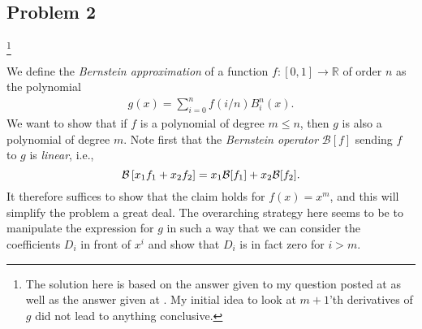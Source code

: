 \documentclass{amsart}
\begin{document}
\subsection*{Problem 2}\footnote{The solution here is based on the answer
	given to my question posted at \cite{1915642} as well as the
	answer given at \cite{377929}. My initial idea to look at $m+1$'th
	derivatives of $g$ did not lead to anything conclusive.}
	\label{sub:problem_2}

We define the \emph{Bernstein approximation} of a function $f: [0, 1] \to
\mathbb{R}$ of order $n$ as the polynomial
\begin{align*}
	g(x) = \sum^{n}_{i=0} f \left( i / n \right) B_i^n(x).
\end{align*}
We want to show that if $f$ is a polynomial of degree $m \leq n$, then $g$
is also a polynomial of degree $m$. Note first that the \emph{Bernstein
operator} $\mathcal{B}[f]$ sending $f$ to $g$ is \emph{linear}, i.e.,
\begin{equation}
	\notag
	\mathcal{B}\left[x_1f_1 + x_2f_2\right] = x_1\mathcal{B}[f_1] + x_2\mathcal{B}[f_2].
\end{equation}
It therefore suffices to show that the claim holds for $f(x) = x^m$, and
this will simplify the problem a great deal. The overarching strategy here
seems to be to manipulate the expression for $g$ in such a way that we can
consider the coefficients $D_i$ in front of $x^i$ and show that $D_i$ is
in fact zero for $i > m$.
\end{document}
